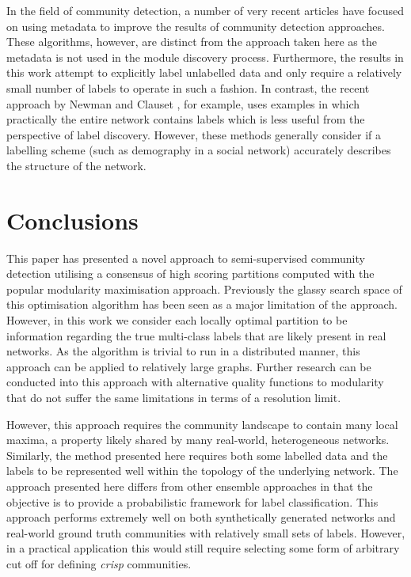\documentclass[sigconf]{acmart}
\begin{document}
In the field of community detection, a number of very recent articles have focused on using metadata to improve the results of community detection approaches.
These algorithms, however, are distinct from the approach taken here as the metadata is not used in the module discovery process.
Furthermore, the results in this work attempt to explicitly label unlabelled data and only require a relatively small number of labels to operate in such a fashion.
In contrast,  the recent approach by Newman and Clauset \cite{newman2016structure}, for example, uses examples in which practically the entire network contains labels which is less useful from the perspective of label discovery.
However, these methods generally consider if a labelling scheme (such as demography in a social network) accurately describes the structure of the network. 

\section{Conclusions}
This paper has presented a novel approach to semi-supervised community detection utilising a consensus of high scoring partitions computed with the popular modularity maximisation approach.
Previously the glassy search space of this optimisation algorithm has been seen as a major limitation of the approach.
However, in this work we consider each locally optimal partition to be information regarding the true multi-class labels that are likely present in real networks.
As the algorithm is trivial to run in a distributed manner, this approach can be applied to relatively large graphs.
Further research can be conducted into this approach with alternative quality functions to modularity that do not suffer the same limitations in terms of a resolution limit.

However, this approach requires the community landscape to contain many local maxima, a property likely shared by many real-world, heterogeneous networks.
Similarly, the method presented here requires both some labelled data and the labels to be represented well within the topology of the underlying network.
The approach presented here differs from other ensemble approaches in that the objective is to provide a probabilistic framework for label classification.
This approach performs extremely well on both synthetically generated networks and real-world ground truth communities with relatively small sets of labels.
However, in a practical application this would still require selecting some form of arbitrary cut off for defining \textit{crisp} communities.
\end{document}
